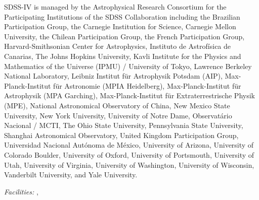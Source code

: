\documentclass[12pt, letterpaper, preprint]{aastex}
\begin{document}
SDSS-IV is managed by the Astrophysical Research Consortium for the 
Participating Institutions of the SDSS Collaboration including the 
Brazilian Participation Group, the Carnegie Institution for Science, 
Carnegie Mellon University, the Chilean Participation Group, the French Participation Group, Harvard-Smithsonian Center for Astrophysics, 
Instituto de Astrof\'isica de Canarias, The Johns Hopkins University, 
Kavli Institute for the Physics and Mathematics of the Universe (IPMU) / 
University of Tokyo, Lawrence Berkeley National Laboratory, 
Leibniz Institut f\"ur Astrophysik Potsdam (AIP),  
Max-Planck-Institut f\"ur Astronomie (MPIA Heidelberg), 
Max-Planck-Institut f\"ur Astrophysik (MPA Garching), 
Max-Planck-Institut f\"ur Extraterrestrische Physik (MPE), 
National Astronomical Observatory of China, New Mexico State University, 
New York University, University of Notre Dame, 
Observat\'ario Nacional / MCTI, The Ohio State University, 
Pennsylvania State University, Shanghai Astronomical Observatory, 
United Kingdom Participation Group,
Universidad Nacional Aut\'onoma de M\'exico, University of Arizona, 
University of Colorado Boulder, University of Oxford, University of Portsmouth, 
University of Utah, University of Virginia, University of Washington, University of Wisconsin, 
Vanderbilt University, and Yale University.

{\it Facilities:} ,  
\end{document}

